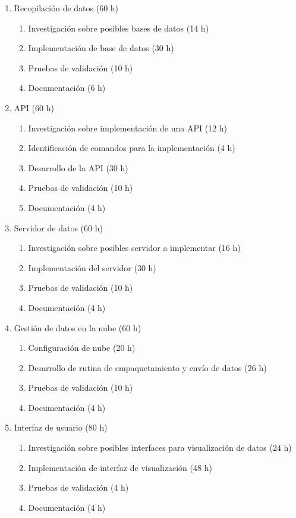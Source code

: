 \documentclass[
11pt, %
codirector, %
]{charter}
\begin{document}
\begin{enumerate}
\item Recopilación de datos (60 h)
	\begin{enumerate}
	\item Investigación sobre posibles bases de datos (14 h)
	\item Implementación de base de datos (30 h)
	\item Pruebas de validación (10 h)
	\item Documentación (6 h)
	\end{enumerate}

\item API (60 h)
	\begin{enumerate}
	\item Investigación sobre implementación de una API (12 h)
	\item Identificación de comandos para la implementación (4 h)
	\item Desarrollo de la API (30 h)
	\item Pruebas de validación (10 h)
	\item Documentación (4 h)
	\end{enumerate}

\item Servidor de datos (60 h)
	\begin{enumerate}
	\item Investigación sobre posibles servidor a implementar (16 h)	
	\item Implementación del servidor (30 h)
	\item Pruebas de validación (10 h)
	\item Documentación (4 h)
	\end{enumerate}
	
\item Gestión de datos en la nube (60 h)
	\begin{enumerate}
	\item Configuración de nube (20 h)
	\item Desarrollo de rutina de empaquetamiento y envío de datos (26 h)
	\item Pruebas de validación (10 h)
	\item Documentación (4 h)
	\end{enumerate}	

\item Interfaz de usuario (80 h)
	\begin{enumerate}
	\item Investigación sobre posibles interfaces para visualización de datos (24 h)
	\item Implementación de interfaz de visualización (48 h)
	\item Pruebas de validación (4 h)
	\item Documentación (4 h)
	\end{enumerate}		
	
\end{enumerate}
\end{document}
